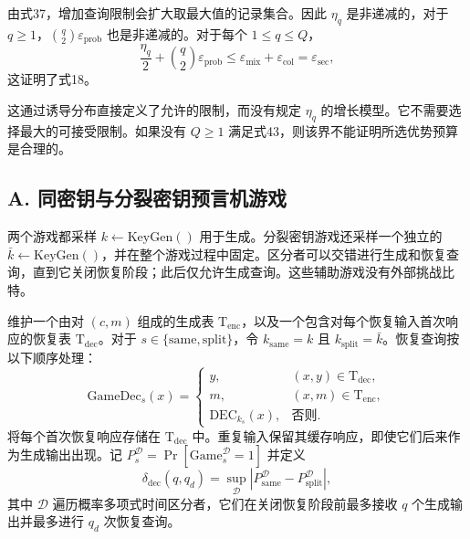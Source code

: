 由式37，增加查询限制会扩大取最大值的记录集合。因此 \(\eta_q\) 是非递减的，对于 \(q \ge 1\)，\(\binom{q}{2} \varepsilon_{\mathrm{prob}}\) 也是非递减的。对于每个 \(1 \le q \le Q\)，
\begin{equation}
\frac{\eta_q}{2} + \binom{q}{2} \varepsilon_{\mathrm{prob}} \le \varepsilon_{\mathrm{mix}} + \varepsilon_{\mathrm{col}} = \varepsilon_{\mathrm{sec}}, \tag{44}
\end{equation}
这证明了式18。

这通过诱导分布直接定义了允许的限制，而没有规定 \(\eta_q\) 的增长模型。它不需要选择最大的可接受限制。如果没有 \(Q \ge 1\) 满足式43，则该界不能证明所选优势预算是合理的。


\subsection*{A. 同密钥与分裂密钥预言机游戏}

两个游戏都采样 \(k \leftarrow \mathrm{KeyGen}()\) 用于生成。分裂密钥游戏还采样一个独立的 \(\bar{k} \leftarrow \mathrm{KeyGen}()\)，并在整个游戏过程中固定。区分者可以交错进行生成和恢复查询，直到它关闭恢复阶段；此后仅允许生成查询。这些辅助游戏没有外部挑战比特。

维护一个由对 \((c, m)\) 组成的生成表 \(\mathrm{T}_{\mathrm{enc}}\)，以及一个包含对每个恢复输入首次响应的恢复表 \(\mathrm{T}_{\mathrm{dec}}\)。对于 \(s \in \{\mathrm{same}, \mathrm{split}\}\)，令 \(k_{\mathrm{same}} = k\) 且 \(k_{\mathrm{split}} = \bar{k}\)。恢复查询按以下顺序处理：
\begin{equation}
\mathrm{GameDec}_s(x) = 
\begin{cases}
y, & (x, y) \in \mathrm{T}_{\mathrm{dec}}, \\
m, & (x, m) \in \mathrm{T}_{\mathrm{enc}}, \\
\mathrm{DEC}_{k_s}(x), & \text{否则}.
\end{cases} \tag{45}
\end{equation}
将每个首次恢复响应存储在 \(\mathrm{T}_{\mathrm{dec}}\) 中。重复输入保留其缓存响应，即使它们后来作为生成输出出现。记 \(P_s^{\mathcal{D}} = \Pr[\mathrm{Game}_s^{\mathcal{D}} = 1]\) 并定义
\begin{equation}
\delta_{\mathrm{dec}}(q, q_d) = \sup_{\mathcal{D}} \left| P_{\mathrm{same}}^{\mathcal{D}} - P_{\mathrm{split}}^{\mathcal{D}} \right|, \tag{46}
\end{equation}
其中 \(\mathcal{D}\) 遍历概率多项式时间区分者，它们在关闭恢复阶段前最多接收 \(q\) 个生成输出并最多进行 \(q_d\) 次恢复查询。

